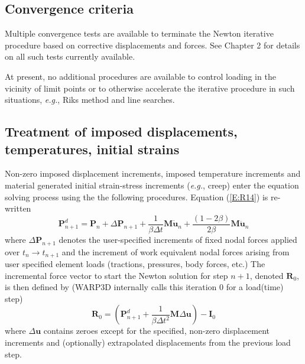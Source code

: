 \documentclass[11pt]{report}
\numberwithin{equation}{section}
\newcommand{\eg}{\emph{e.g.},\xspace}
\newcommand{\nid}{\noindent}
\begin{document}
\subsection{Convergence criteria}

\noindent Multiple convergence tests are available to terminate the Newton iterative 
procedure based on corrective displacements and forces. See Chapter 2 for details on all
such tests currently available. 

At present, no additional procedures are available to control loading in the vicinity 
of limit points or to otherwise accelerate the iterative procedure in such situations,
\eg Riks method and line searches.


\subsection{Treatment of imposed displacements, temperatures, initial strains}

\noindent Non-zero imposed displacement increments, imposed 
temperature increments and material generated initial strain-stress
increments (\eg creep)
enter the equation solving process using the the following procedures.
Equation (\ref{E:R14}) is re-written
%
\begin{equation}\label{E:S1}
 \bm{P}_{n+1}^d = \bm{P}_n  + \Delta \bm{P}_{n+1} + \frac{1}{\beta \Delta t} 
 \mathbf{M} {\dot{\bm{u}}}_n + \frac{\left ( 1 - 2 \beta \right)}{2 \beta}  \mathbf{M} {\ddot{\bm{u}}_n} 
\end{equation}
%
\nid where $\Delta \bm{P}_{n+1}$ denotes the user-specified increments of fixed nodal forces applied
over $t_n \rightarrow t_{n+1}$ and the increment of work equivalent nodal forces 
arising from user specified element loads (tractions, pressures, body forces, etc.)
The incremental force vector to start the Newton solution for
step $n+1$, denoted $\bm{R}_0$, is then defined by (WARP3D internally calls this iteration 0
for a load(time) step)
%
\begin{equation}\label{E:S2}
 \bm{R}_0 =\left (  \bm{P}_{n+1}^d + \frac{1}{\beta \Delta t^2} 
 \mathbf{M} {\Delta{\bm{u}}}  \right )  - \bm{I}_0 
\end{equation}
%
\nid where $\Delta \bm{u}$ contains zeroes except for the 
specified, non-zero displacement increments and
(optionally) extrapolated displacements from the previous load step.
\end{document}
